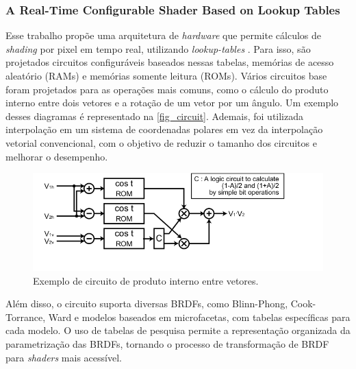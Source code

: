 \subsubsection{A Real-Time Configurable Shader Based on Lookup Tables}


Esse trabalho propõe uma arquitetura de \textit{hardware} que permite cálculos de \textit{shading} por pixel em tempo real, utilizando \textit{lookup-tables} \cite{configurable}. Para isso, são projetados circuitos configuráveis baseados nessas tabelas, memórias de acesso aleatório (RAMs) e memórias somente leitura (ROMs). Vários circuitos base foram projetados para as operações mais comuns, como o cálculo do produto interno entre dois vetores e a rotação de um vetor por um ângulo. Um exemplo desses diagramas é representado na \autoref{fig_circuit}. Ademais, foi utilizada interpolação em um sistema de coordenadas polares em vez da interpolação vetorial convencional, com o objetivo de reduzir o tamanho dos circuitos e melhorar o desempenho.





\begin{figure}[H]
        \caption{\label{fig_circuit}\small Exemplo de circuito de produto interno entre vetores.}
        \begin{center}
            \includegraphics[scale=0.7]{./Imagens/rom-cos-lookup-table.png}
        \end{center}
\end{figure}



Além disso, o circuito suporta diversas BRDFs, como Blinn-Phong, Cook-Torrance, Ward e modelos baseados em microfacetas, com tabelas específicas para cada modelo. O uso de tabelas de pesquisa permite a representação organizada da parametrização das BRDFs, tornando o processo de transformação de BRDF para \textit{shaders} mais acessível.

